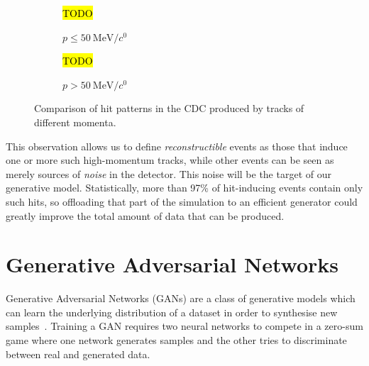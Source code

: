 \begin{figure}
    \centering
    \begin{subfigure}{0.4\textwidth}
        \centering
        \hl{TODO}
        \caption{$p\leq\SI{50}{\MeV/\clight}$}
        \label{fig:cdc_rconst_vs_noise:low}
    \end{subfigure}
    \hfill
    \begin{subfigure}{0.4\textwidth}
        \centering
        \hl{TODO}
        \caption{$p > \SI{50}{\MeV/\clight}$}
        \label{fig:cdc_rconst_vs_noise:high}
    \end{subfigure}
    \caption{Comparison of hit patterns in the CDC produced by tracks of different momenta.}
    \label{fig:cdc_rconst_vs_noise}
\end{figure}

This observation allows us to define \emph{reconstructible} events as those that induce one or more such high-momentum tracks, while other events can be seen as merely sources of \emph{noise} in the detector. This noise will be the target of our generative model. Statistically, more than 97\% of hit-inducing events contain only such hits, so offloading that part of the simulation to an efficient generator could greatly improve the total amount of data that can be produced.





\section{Generative Adversarial Networks}
Generative Adversarial Networks (GANs) are a class of generative models which can learn the underlying distribution of a dataset in order to synthesise new samples~\cite{goodfellow_generative_2014}. Training a GAN requires two neural networks to compete in a zero-sum game where one network generates samples and the other tries to discriminate between real and generated data.

